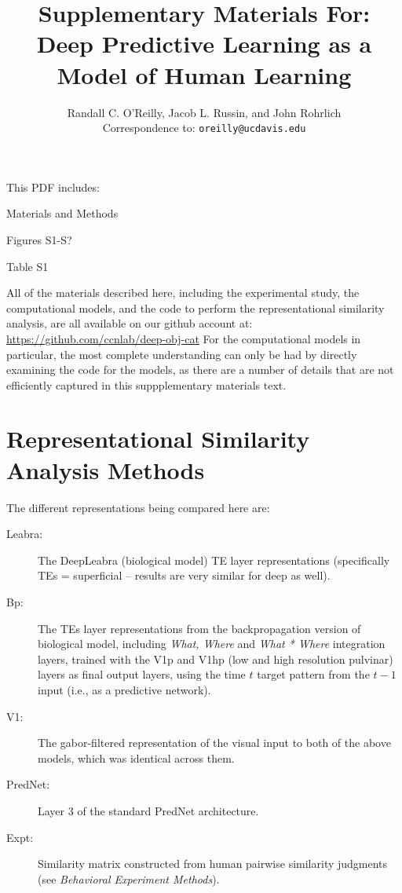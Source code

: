 \documentclass[12pt,twoside]{article}
\title{ Supplementary Materials For:\\
Deep Predictive Learning as a Model of Human Learning }
\author{Randall C. O'Reilly, Jacob L. Russin, and John Rohrlich\\
  Correspondence to: \texttt{oreilly@ucdavis.edu}\\}
\newif\myifpdf
\begin{document}
\sloppy
\raggedbottom

\maketitle 

\noindent This PDF includes:
\begin{description}
\item Materials and Methods
\item Figures S1-S?
\item Table S1
\end{description}

\clearpage

\pagestyle{myheadings}

All of the materials described here, including the experimental study, the computational models, and the code to perform the representational similarity analysis, are all available on our github account at: \url{https://github.com/ccnlab/deep-obj-cat}  For the computational models in particular, the most complete understanding can only be had by directly examining the code for the models, as there are a number of details that are not efficiently captured in this suppplementary materials text.

\section{Representational Similarity Analysis Methods}

The different representations being compared here are:
\begin{description}
\item[Leabra:] The DeepLeabra (biological model) TE layer representations (specifically TEs = superficial -- results are very similar for deep as well).
\item[Bp:] The TEs layer representations from the backpropagation version of biological model, including {\em What, Where} and {\em What * Where} integration layers, trained with the V1p and V1hp (low and high resolution pulvinar) layers as final output layers, using the time $t$ target pattern from the $t-1$ input (i.e., as a predictive network).
\item[V1:] The gabor-filtered representation of the visual input to both of the above models, which was identical across them.
\item[PredNet:] Layer 3 of the standard PredNet architecture.
\item[Expt:] Similarity matrix constructed from human pairwise similarity judgments (see {\em Behavioral Experiment Methods}).
\end{description}
\end{document}
